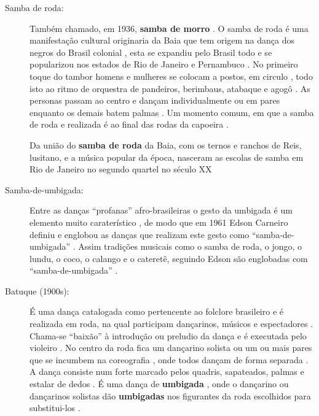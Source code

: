 \begin{description}
\item [Samba de roda:]
\label{ref:Samba-de-roda-danca}
Também chamado, em 1936, \textbf{samba de morro} \cite[pp. 18]{jornalsambaderoda3}.
O samba de roda é uma manifestação cultural originaria da Baia que tem origem na dança dos negros do Brasil colonial \cite[pp. 21]{brasilpandeiro} \cite{silva2009capoeira},
esta se expandiu pelo Brasil todo e se popularizou nos estados de Rio de Janeiro e Pernambuco \cite{silva2009capoeira}.
No primeiro toque do tambor homens e mulheres se colocam a postos,
em circulo \cite[pp. 21]{brasilpandeiro} \cite{silva2009capoeira},
todo isto ao ritmo de orquestra de pandeiros, berimbaus, atabaque e agogô  \cite{silva2009capoeira}.
As personas passam ao centro e dançam individualmente ou em pares enquanto os demais batem palmas \cite[pp. 21]{brasilpandeiro}.
Um momento comum, em que a samba de roda e realizada é ao final das rodas da capoeira \cite{silva2009capoeira}.

Da união do \textbf{samba de roda} da Baia, com os ternos e ranchos de Reis, lusitano, 
e a música popular da época, 
nasceram as escolas de samba em Rio de Janeiro no segundo quartel no século XX \cite[pp. 8]{jornalsambaderoda4}

\item [Samba-de-umbigada:]
\label{ref:samba-de-umbigada}
Entre as danças ``profanas'' %
afro-brasileiras o gesto da umbigada é um elemento muito caraterístico \cite[pp. 32]{jornalsambaderoda2} \cite[pp. 85]{sandroni2001feitico},
de modo que em 1961 Edson Carneiro definiu e englobou as danças que realizam este 
gesto como ``samba-de-umbigada'' . Assim tradições 
musicais como o samba de roda, o jongo, o lundu, o coco, o calango e o cateretê, 
seguindo Edson são englobadas com  ``samba-de-umbigada'' \cite[pp. 85]{sandroni2001feitico}.

\item [Batuque (1900s):]
\label{ref:batuquedanca}
É uma dança catalogada como pertencente ao folclore brasileiro  \cite[pp. 96]{sandroni2001feitico} e
é realizada em roda, na qual participam dançarinos, músicos e espectadores \cite[pp. 89]{marcondes1977enciclopedia}.
Chama-se ``baixão'' à introdução ou preludio da dança  e é executada pelo violeiro  \cite[pp. 89]{marcondes1977enciclopedia}.
No centro da roda fica um dançarino solista ou um ou mais pares
que se incumbem na coreografia \cite[pp. 89]{marcondes1977enciclopedia},
onde todos dançam de forma separada \cite[pp. 65]{sandroni2001feitico}.
A dança consiste num forte marcado pelos quadris, sapateados, palmas e estalar de dedos  \cite[pp. 89]{marcondes1977enciclopedia}.
É uma dança de \textbf{umbigada} \cite[pp. 96]{sandroni2001feitico} \cite[pp. 89]{marcondes1977enciclopedia}, 
onde o dançarino ou dançarinos solistas
dão \textbf{umbigadas} nos figurantes da roda  escolhidos para substitui-los \cite[pp. 89]{marcondes1977enciclopedia}.


\end{description}
